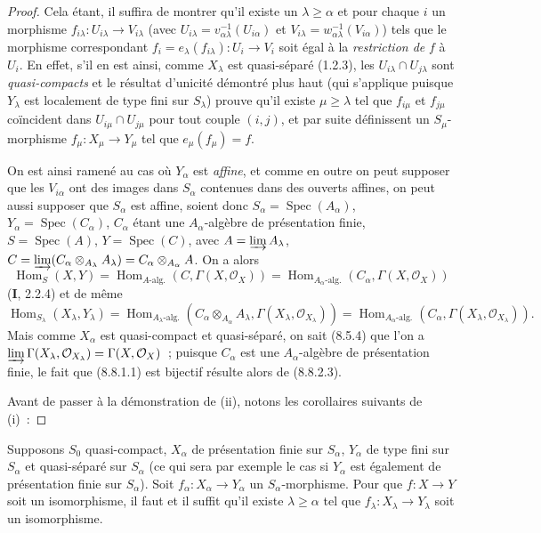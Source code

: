 \begin{proof}
Cela étant, il suffira de montrer qu'il existe un $\lambda\geq\alpha$ et pour
chaque $i$ un morphisme $f_{i\lambda}:U_{i\lambda}\to V_{i\lambda}$ (avec
$U_{i\lambda}=v_{\alpha\lambda}^{-1}(U_{i\alpha})$ et
$V_{i\lambda}=w_{\alpha\lambda}^{-1}(V_{i\alpha})$) tels que le morphisme
correspondant $f_i=e_\lambda(f_{i\lambda}):U_i\to V_i$ soit égal à la
\emph{restriction de} $f$ à $U_i$. En effet, s'il en est ainsi, comme
$X_\lambda$ est quasi-séparé (1.2.3), les
$U_{i\lambda}\cap U_{j\lambda}$ sont \emph{quasi-compacts} et le résultat
d'unicité démontré plus haut (qui s'applique puisque $Y_\lambda$ est
localement de type fini sur $S_\lambda$) prouve qu'il existe
$\mu\geq\lambda$ tel que $f_{i\mu}$ et $f_{j\mu}$ coïncident dans
$U_{i\mu}\cap U_{j\mu}$ pour tout couple $(i,j)$, et par suite définissent un
$S_\mu$-morphisme $f_\mu:X_\mu\to Y_\mu$ tel que $e_\mu(f_\mu)=f$.

On est ainsi ramené au cas où $Y_\alpha$ est \emph{affine}, et comme en outre
on peut supposer que les $V_{i\alpha}$ ont des images dans $S_\alpha$
contenues dans des ouverts affines, on peut aussi supposer que $S_\alpha$ est
affine, soient donc $S_\alpha=\operatorname{Spec}(A_\alpha)$,
$Y_\alpha=\operatorname{Spec}(C_\alpha)$, $C_\alpha$ étant une
$A_\alpha$-algèbre de présentation finie, $S=\operatorname{Spec}(A)$,
$Y=\operatorname{Spec}(C)$, avec $A=\varinjlim A_\lambda$,
$C=\varinjlim(C_\alpha\otimes_{A_\lambda}A_\lambda)=
C_\alpha\otimes_{A_\alpha}A$. On a alors
\[
\operatorname{Hom}_S(X,Y)=
\operatorname{Hom}_{A\text{-alg.}}(C,\Gamma(X,\mathcal O_X))=
\operatorname{Hom}_{A_\alpha\text{-alg.}}(C_\alpha,\Gamma(X,\mathcal O_X))
\]
(\textbf{I}, 2.2.4) et de même
\[
\operatorname{Hom}_{S_\lambda}(X_\lambda,Y_\lambda)=
\operatorname{Hom}_{A_\lambda\text{-alg.}}
(C_\alpha\otimes_{A_\alpha}A_\lambda,\Gamma(X_\lambda,\mathcal O_{X_\lambda}))=
\operatorname{Hom}_{A_\alpha\text{-alg.}}
(C_\alpha,\Gamma(X_\lambda,\mathcal O_{X_\lambda})).
\]
Mais comme $X_\alpha$ est quasi-compact et quasi-séparé, on sait (8.5.4) que
l'on a
$\varinjlim\Gamma(X_\lambda,\mathcal O_{X_\lambda})=
\Gamma(X,\mathcal O_X)$~; puisque $C_\alpha$ est une $A_\alpha$-algèbre de
présentation finie, le fait que (8.8.1.1) est bijectif résulte alors de
(8.8.2.3).

Avant de passer à la démonstration de (ii), notons les corollaires suivants de
(i)~:
\end{proof}

\begin{corollary}[8.8.2.4]
\label{IV.8.8.2.4-fr}
Supposons $S_0$ quasi-compact, $X_\alpha$ de présentation finie sur $S_\alpha$,
$Y_\alpha$ de type fini sur $S_\alpha$ et quasi-séparé sur $S_\alpha$ \textup{(ce qui
sera par exemple le cas si $Y_\alpha$ est également}
\textup{de présentation finie sur $S_\alpha$)}. Soit
$f_\alpha:X_\alpha\to Y_\alpha$ un $S_\alpha$-morphisme. Pour que
$f:X\to Y$ soit un isomorphisme, il faut et il suffit qu'il existe
$\lambda\geq\alpha$ tel que $f_\lambda:X_\lambda\to Y_\lambda$ soit un
isomorphisme.
\end{corollary}


